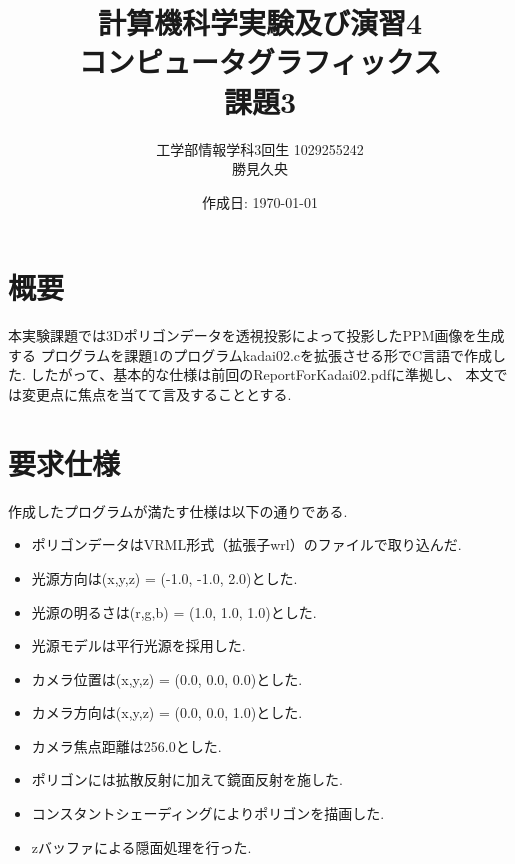 \documentclass[a4j,dvipdfmx]{jsarticle}
\begin{document}
\title{計算機科学実験及び演習4\\コンピュータグラフィックス\\課題3}
\author{工学部情報学科3回生 1029255242\\勝見久央}
\date{作成日: \today} %
\maketitle
\section{概要}
本実験課題では3Dポリゴンデータを透視投影によって投影したPPM画像を生成する
プログラムを課題1のプログラムkadai02.cを拡張させる形でC言語で作成した.
したがって、基本的な仕様は前回のReportForKadai02.pdfに準拠し、
本文では変更点に焦点を当てて言及することとする.

\section{要求仕様}
作成したプログラムが満たす仕様は以下の通りである.
\begin{itemize}
\item ポリゴンデータはVRML形式（拡張子wrl）のファイルで取り込んだ.
\item 光源方向は(x,y,z) = (-1.0, -1.0, 2.0)とした.
\item 光源の明るさは(r,g,b) = (1.0, 1.0, 1.0)とした.
\item 光源モデルは平行光源を採用した.
\item カメラ位置は(x,y,z) = (0.0, 0.0, 0.0)とした.
\item カメラ方向は(x,y,z) = (0.0, 0.0, 1.0)とした.
\item カメラ焦点距離は256.0とした.
\item ポリゴンには拡散反射に加えて鏡面反射を施した.
\item コンスタントシェーディングによりポリゴンを描画した.
\item zバッファによる隠面処理を行った.
\end{itemize}
\end{document}
